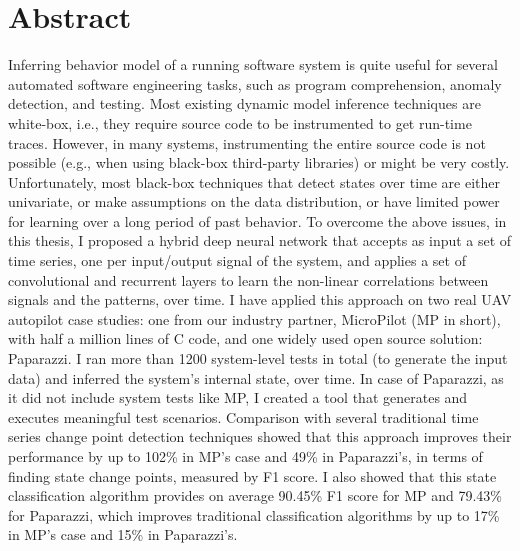 
\chapter{Abstract}
Inferring behavior model of a running software system is quite useful for several automated software engineering tasks, such as program comprehension, anomaly detection, and testing. Most existing dynamic model inference techniques are white-box, i.e., they require source code to be instrumented to get run-time traces. However, in many systems, instrumenting the entire source code is not possible (e.g., when using black-box third-party libraries) or might be very costly. %
Unfortunately, most black-box techniques that detect states over time are either univariate, or make assumptions on the data distribution, or have limited power for learning over a long period of past behavior. 
To overcome the above issues, in this thesis, I proposed a hybrid deep neural network that accepts as input a set of time series, one per input/output signal of the system, and applies a set of convolutional and recurrent layers to learn the non-linear correlations between signals and the patterns, over time. 
I have applied this approach on two real UAV autopilot case studies: one from our industry partner, MicroPilot (MP in short), with half a million lines of C code, and one widely used open source solution: Paparazzi. 
I ran more than 1200 system-level tests in total (to generate the input data) and inferred the system's internal state, over time.
In case of Paparazzi, as it did not include system tests like MP, I created a tool that generates and executes meaningful test scenarios.
Comparison with several traditional time series change point detection techniques showed that this approach improves their performance by up to 102\% in MP's case and 49\% in Paparazzi's, in terms of finding state change points, measured by F1 score. I also showed that this state classification algorithm provides on average 90.45\% F1 score for MP and 79.43\% for Paparazzi, which improves traditional classification algorithms by up to 17\% in MP's case and 15\% in Paparazzi's.

